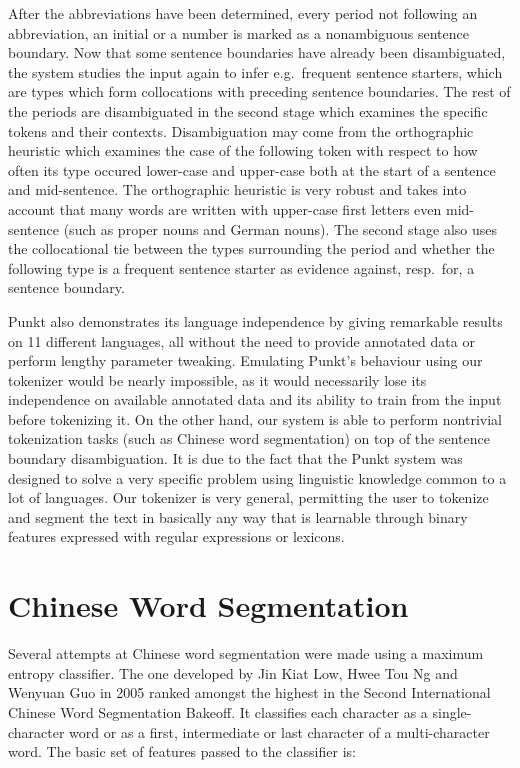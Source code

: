 After the abbreviations have been determined, every period not following an
abbreviation, an initial or a number is marked as a nonambiguous sentence
boundary. Now that some sentence boundaries have already been disambiguated,
the system studies the input again to infer e.g.\ frequent sentence starters,
which are types which form collocations with preceding sentence boundaries. The
rest of the periods are disambiguated in the second stage which examines the
specific tokens and their contexts. Disambiguation may come from the
orthographic heuristic which examines the case of the following token with
respect to how often its type occured lower-case and upper-case both at the
start of a sentence and mid-sentence. The orthographic heuristic is very robust
and takes into account that many words are written with upper-case first
letters even mid-sentence (such as proper nouns and German nouns). The second
stage also uses the collocational tie between the types surrounding the period
and whether the following type is a frequent sentence starter as evidence
against, resp.\ for, a sentence boundary.

Punkt also demonstrates its language independence by giving remarkable results
on 11 different languages, all without the need to provide annotated data or
perform lengthy parameter tweaking. Emulating Punkt's behaviour using our
tokenizer would be nearly impossible, as it would necessarily lose its
independence on available annotated data and its ability to train from the
input before tokenizing it. On the other hand, our system is able to perform
nontrivial tokenization tasks (such as Chinese word segmentation) on top of the
sentence boundary disambiguation. It is due to the fact that the Punkt system
was designed to solve a very specific problem using linguistic knowledge common
to a lot of languages. Our tokenizer is very general, permitting the user to
tokenize and segment the text in basically any way that is learnable through
binary features expressed with regular expressions or lexicons.

\section{Chinese Word Segmentation}
\label{survey-chinese}

Several attempts at Chinese word segmentation were made using a maximum entropy
classifier. The one developed by Jin Kiat Low, Hwee Tou Ng and Wenyuan Guo in
2005 \cite{seg-chinese-maxent} ranked amongst the highest in the Second
International Chinese Word Segmentation Bakeoff. It classifies each character
as a single-character word or as a first, intermediate or last character of a
multi-character word. The basic set of features passed to the classifier is:

